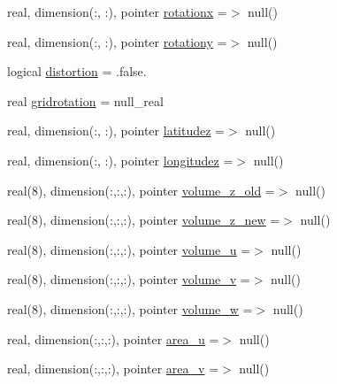 \begin{DoxyCompactItemize}
\item 
real, dimension(\+:, \+:), pointer \mbox{\hyperlink{structmodulehydrodynamic_1_1t__external_acffa3ca6abbd2d3218d7e3f34e03a352}{rotationx}} =$>$ null()
\item 
real, dimension(\+:, \+:), pointer \mbox{\hyperlink{structmodulehydrodynamic_1_1t__external_aac0d68a61c0e625cbc832362d4a7f71d}{rotationy}} =$>$ null()
\item 
logical \mbox{\hyperlink{structmodulehydrodynamic_1_1t__external_a27f9ecb1f5b0576d46beec3bf51ba777}{distortion}} = .false.
\item 
real \mbox{\hyperlink{structmodulehydrodynamic_1_1t__external_ad7ef65cb536c349ac47df49e7ec6c42e}{gridrotation}} = null\+\_\+real
\item 
real, dimension(\+:, \+:), pointer \mbox{\hyperlink{structmodulehydrodynamic_1_1t__external_ac2fa5f05f24a0f3e3a359b76bd599597}{latitudez}} =$>$ null()
\item 
real, dimension(\+:, \+:), pointer \mbox{\hyperlink{structmodulehydrodynamic_1_1t__external_ada14d85a6d1bb94fdbf93e513e4ef506}{longitudez}} =$>$ null()
\item 
real(8), dimension(\+:,\+:,\+:), pointer \mbox{\hyperlink{structmodulehydrodynamic_1_1t__external_a9ab3d0e0db1629532a0c2fd92e982b1f}{volume\+\_\+z\+\_\+old}} =$>$ null()
\item 
real(8), dimension(\+:,\+:,\+:), pointer \mbox{\hyperlink{structmodulehydrodynamic_1_1t__external_abee963c48387a2a7e5e7fc114714e1ea}{volume\+\_\+z\+\_\+new}} =$>$ null()
\item 
real(8), dimension(\+:,\+:,\+:), pointer \mbox{\hyperlink{structmodulehydrodynamic_1_1t__external_aa76086b275fe1dded0327b08e0d5d62c}{volume\+\_\+u}} =$>$ null()
\item 
real(8), dimension(\+:,\+:,\+:), pointer \mbox{\hyperlink{structmodulehydrodynamic_1_1t__external_a01e5c7d9044acab46d2f6f5e710ceeb9}{volume\+\_\+v}} =$>$ null()
\item 
real(8), dimension(\+:,\+:,\+:), pointer \mbox{\hyperlink{structmodulehydrodynamic_1_1t__external_a35bab29625b80968a61e7173abadeb2c}{volume\+\_\+w}} =$>$ null()
\item 
real, dimension(\+:,\+:,\+:), pointer \mbox{\hyperlink{structmodulehydrodynamic_1_1t__external_ab0272e92a78b78362eb5e60aa797183c}{area\+\_\+u}} =$>$ null()
\item 
real, dimension(\+:,\+:,\+:), pointer \mbox{\hyperlink{structmodulehydrodynamic_1_1t__external_a9af970272a6f840e9b37d8091ec059b9}{area\+\_\+v}} =$>$ null()

\end{DoxyCompactItemize}
